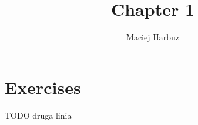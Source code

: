 \documentclass[12pt, a4paper]{article}
\title{Chapter 1}
\author{Maciej Harbuz}
\begin{document}
\maketitle

\section{Exercises}
TODO
druga linia
\end{document}

